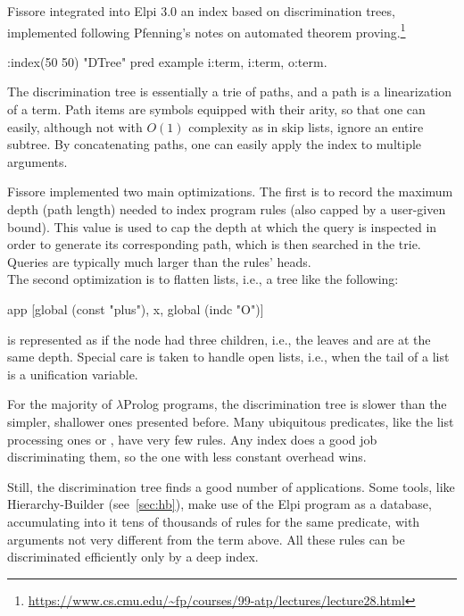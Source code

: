 \documentclass[a4paper, 11pt]{book}
\begin{document}
Fissore integrated into Elpi 3.0 an index based on discrimination trees,
implemented following Pfenning's notes on automated theorem
proving.\footnote{\url{https://www.cs.cmu.edu/~fp/courses/99-atp/lectures/lecture28.html}}

\begin{elpicode}
:index(50 50) "DTree" %
pred example i:term, i:term, o:term.
\end{elpicode}


The discrimination tree is essentially a trie of paths, and a path is a
linearization of a term. Path items are symbols equipped with their arity, so
that one can easily, although not with $O(1)$ complexity as in skip lists,
ignore an entire subtree. By concatenating paths, one can easily apply the
index to multiple arguments.


Fissore implemented two main optimizations. The first is to record the maximum
depth (path length) needed to index program rules (also capped by a user-given
bound). This value is used to cap the depth at which the query is inspected in
order to generate its corresponding path, which is then searched in the trie.
Queries are typically much larger than the rules' heads.\\
The second optimization is to flatten lists, i.e., a tree like the following:
\begin{elpicode}
app [global (const "plus"), x, global (indc "O")]
\end{elpicode}
\noindent
is represented as if the  node had three children, i.e., the leaves
 and  are at the same depth. Special care is taken to
handle open lists, i.e., when the tail of a list is a unification variable.


For the majority of $\lambda$Prolog programs, the discrimination tree is
slower than the simpler, shallower ones presented before. Many ubiquitous
predicates, like the list processing ones  or , have very
few rules. Any index does a good job discriminating them, so the one with less
constant overhead wins.


Still, the discrimination tree finds a good number of applications. Some tools,
like Hierarchy-Builder (see~\cref{sec:hb}), make use of the Elpi program as a
database, accumulating into it tens of thousands of rules for the same
predicate, with arguments not very different from the term above. All these
rules can be discriminated efficiently only by a deep index.
\end{document}
